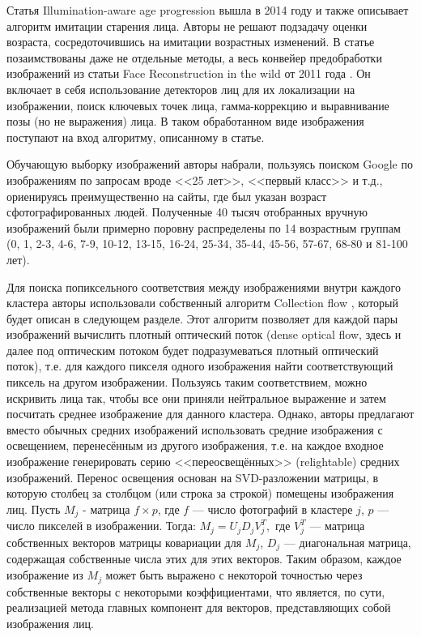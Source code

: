 
Статья Illumination-aware age progression \cite{illumination_aware} вышла в 2014 году и также описывает алгоритм имитации старения лица. Авторы не решают подзадачу оценки возраста, сосредоточившись на имитации возрастных изменений. В статье позаимствованы даже не отдельные методы, а весь конвейер предобработки изображений из статьи Face Reconstruction in the wild от 2011 года \cite{face_wild}. Он включает в себя использование детекторов лиц для их локализации на изображении, поиск ключевых точек лица, гамма-коррекцию и выравнивание позы (но не выражения) лица. В таком обработанном виде изображения поступают на вход алгоритму, описанному в статье.

Обучающую выборку изображений авторы набрали, пользуясь поиском Google по изображениям по запросам вроде <<25 лет>>, <<первый класс>> и т.д., ориенируясь преимущественно на сайты, где был указан возраст сфотографированных людей. Полученные 40 тысяч отобранных вручную изображений были примерно поровну распределены по 14 возрастным группам (0, 1, 2-3, 4-6, 7-9, 10-12, 13-15, 16-24, 25-34, 35-44, 45-56, 57-67, 68-80 и 81-100 лет). 

Для поиска попиксельного соответствия между изображениями внутри каждого кластера авторы использовали собственный алгоритм Collection flow \cite{collection_flow}, который будет описан в следующем разделе. Этот алгоритм позволяет для каждой пары изображений вычислить плотный оптический поток (dense optical flow, здесь и далее под оптическим потоком будет подразумеваться плотный оптический поток), т.е. для каждого пикселя одного изображения найти соответствующий пиксель на другом изображении. Пользуясь таким соответствием, можно искривить лица так, чтобы все они приняли нейтральное выражение и затем посчитать среднее изображение для данного кластера. Однако, авторы предлагают вместо обычных средних изображений использовать средние изображения с освещением, перенесённым из другого изображения, т.е. на каждое входное изображение генерировать серию <<переосвещённых>> (relightable) средних изображений.
Перенос освещения основан на SVD-разложении матрицы, в которую столбец за столбцом (или строка за строкой) помещены изображения лиц. Пусть $ M_j $ - матрица $ f \times p $, где $f$ --- число фотографий в кластере $j$, $p$ --- число пикселей в изображении. Тогда:
$ M_j = U_j D_j V^T_j, $
где $ V^T_j $ --- матрица собственных векторов матрицы ковариации для $ M_j $, $ D_j $ --- диагональная матрица, содержащая собственные числа этих для этих векторов. Таким образом, каждое изображение из $ M_j $ может быть выражено с некоторой точностью через собственные векторы с некоторыми коэффициентами, что является, по сути, реализацией метода главных компонент для векторов, представляющих собой изображения лиц.

